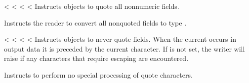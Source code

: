 \documentclass[letterpaper,10pt,english]{sphinxmanual}
\begin{document}

\vspace{5px}

\begin{fulllineitems}
\label{\detokenize{csv:csv.QUOTE_NONNUMERIC}}<%
\pysigstartsignatures
<%
<%
<%
Instructs {\hyperref[\detokenize{csv:csv.writer}]{}} objects to quote all non\sphinxhyphen{}numeric fields.

Instructs the reader to convert all non\sphinxhyphen{}quoted fields to type .

\end{fulllineitems}


\vspace{5px}

\begin{fulllineitems}
\label{\detokenize{csv:csv.QUOTE_NONE}}<%
\pysigstartsignatures
<%
<%
<%
Instructs {\hyperref[\detokenize{csv:csv.writer}]{}} objects to never quote fields.  When the current
 occurs in output data it is preceded by the current 
character.  If  is not set, the writer will raise {\hyperref[\detokenize{csv:csv.Error}]{}} if
any characters that require escaping are encountered.

Instructs {\hyperref[\detokenize{csv:csv.reader}]{}} to perform no special processing of quote characters.

\end{fulllineitems}
\end{document}
